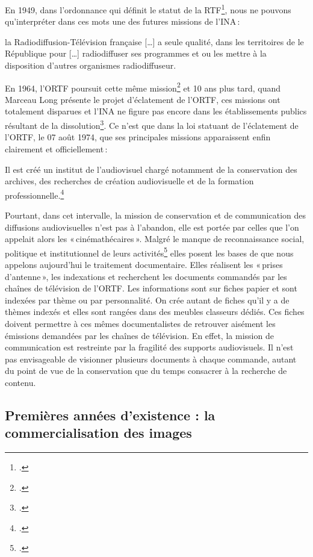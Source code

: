En 1949, dans l’ordonnance qui définit le statut de la RTF\footcite[]{zotero-item-335}, nous ne pouvons qu’interpréter dans ces mots une des futures missions de l’INA : 
\begin{displayquote}
	la Radiodiffusion-Télévision française [\dots] a seule qualité, dans les territoires de le République pour [\dots] radiodiffuser ses programmes et ou les mettre à la disposition d’autres organismes radiodiffuseur.
\end{displayquote}
En 1964, l’ORTF poursuit cette même mission\footcite[]{zotero-item-645} et 10 ans plus tard, quand Marceau Long présente le projet d’éclatement de l’ORTF, ces missions ont totalement disparues et l’INA ne figure pas encore dans les établissements publics résultant de la dissolution\footcite[][118]{cohen2021}. Ce n’est que dans la loi statuant de l’éclatement de l’ORTF, le 07 août 1974, que ses principales missions apparaissent enfin clairement et officiellement :  
\begin{displayquote}
	Il est créé un institut de l’audiovisuel chargé notamment de la conservation des archives, des recherches de création audiovisuelle et de la formation professionnelle.\footcite[]{zotero-item-331}
\end{displayquote}
Pourtant, dans cet intervalle, la mission de conservation et de communication des diffusions audiovisuelles n'est pas à l'abandon, elle est portée par celles que l’on appelait alors les « cinémathécaires ». Malgré le manque de reconnaissance social, politique et institutionnel de leurs activités\footcite[][182]{tible2023} elles posent les bases de que nous appelons aujourd’hui le traitement documentaire. Elles réalisent les « prises d’antenne », les indexations et recherchent les documents commandés par les chaînes de télévision de l'ORTF. Les informations sont sur fiches papier et sont indexées par thème ou par personnalité. On crée autant de fiches qu’il y a de thèmes indexés et elles sont rangées dans des meubles classeurs dédiés. Ces fiches doivent permettre à ces mêmes documentalistes de retrouver aisément les émissions demandées par les chaînes de télévision. En effet, la mission de communication est restreinte par la fragilité des supports audiovisuels. Il n'est pas envisageable de visionner plusieurs documents à chaque commande, autant du point de vue de la conservation que du temps consacrer à la recherche de contenu.

\subsection{Premières années d'existence : la commercialisation des images}

